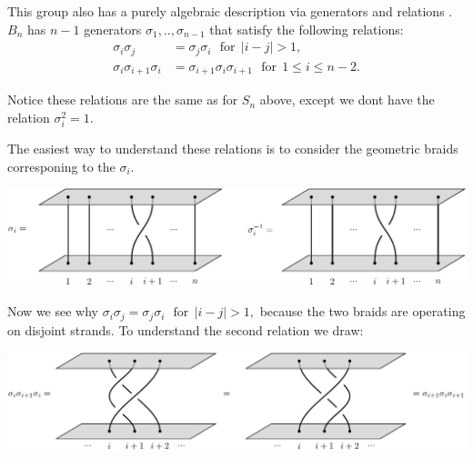 \documentclass[aps, prl, letterpaper, twocolumn, superscriptaddress, notitlepage, 10pt]{revtex4-1}
\begin{document}
This group also has a purely algebraic description via
generators and relations \cite{Artin1947,Birman1974}.
$B_n$ has $n-1$ generators $\sigma_1,..,\sigma_{n-1}$ that satisfy
the following relations:
\begin{align*}
    \sigma_i \sigma_j &= \sigma_j \sigma_i \ \ \ \mbox{for}\ \ |i-j|>1,\\
    \sigma_i \sigma_{i+1} \sigma_i &= \sigma_{i+1} \sigma_i \sigma_{i+1} \ \ \ \mbox{for}\ \ 1\le i \le n-2.
\end{align*}

Notice these relations are the same as for $S_n$ above, except
we dont have the relation $\sigma_i^2 = 1.$

The easiest way to understand these relations is to consider the
geometric braids corresponing to the $\sigma_i.$
\begin{center}
\includegraphics[]{pic-braid-sigma.pdf}
\end{center}
Now we see why 
$\sigma_i \sigma_j = \sigma_j \sigma_i \ \ \ \mbox{for}\ \ |i-j|>1,$
because the two braids are operating on disjoint strands.
To understand the second relation we draw:
\begin{center}
\includegraphics[]{pic-braid-YB.pdf}
\end{center}
\end{document}
